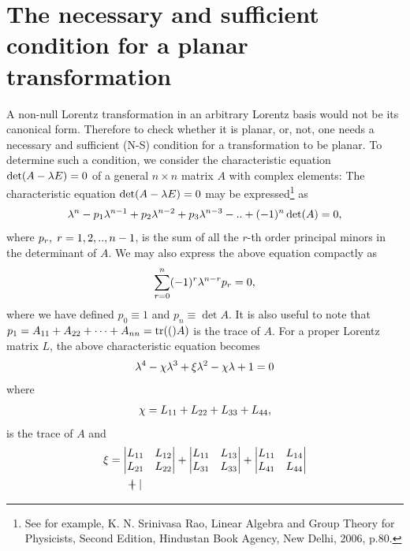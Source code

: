 {\section{The necessary and sufficient condition for a 
planar transformation}
A non-null Lorentz transformation in an arbitrary 
Lorentz basis would not be its canonical form. 
Therefore to check whether it is planar, or, not,  one 
needs a necessary and sufficient (N-S) condition for a 
transformation to be planar. To determine such a 
condition, we consider the characteristic equation 
$\det(A-{\lambda} E)=0 $ of a general $n\times n$ matrix 
$A$ 
with complex elements: The characteristic equation 
$\det(A-{\lambda} E)=0$ may be expressed\footnote{See for 
example, K. N. Srinivasa Rao, {Linear Algebra and 
Group Theory for Physicists}, Second Edition, 
Hindustan 
Book Agency, New Delhi, 2006, p.80.} as 
\begin{align*}
{\lambda}^n-p_1 {\lambda}^{n-1}+p_2 {\lambda}^{n-2}+p_3
{\lambda}^{n-3}-.. +(-1)^{n}\det(A)=0,
\end{align*}
where $p_r,\; r=1,2,.., n-1$, is the {sum of all the 
$r$-th order principal minors} in the determinant of 
$A$. We may also express  the above equation compactly 
as
\begin{align}\label{geom.105}
\sum_{r=0}^n(-1)^r {\lambda}^{n-r}p_r=0,
\end{align}
where we have defined $p_0\equiv 1$ and $p_n\equiv 
\det{A}$. It is also useful to note that 
$p_1=A_{11}+A_{22}+\cdots +A_{nn}=\text{tr}(()A)$ is the trace 
of $A$. For a proper Lorentz matrix $L$, the above 
characteristic equation becomes
\begin{align}\label{geom.106}
 {\lambda}^4-{\chi}{\lambda}^3+ {\xi}{\lambda}^2-{\chi}{\lambda}+1=0
\end{align}
where
\begin{align}\label{geom.107}
 {\chi}=L_{11}+L_{22}+L_{33}+L_{44},
\end{align}
is the trace of $A$ and
\begin{align}\label{geom.108}
&{\xi}=
  \begin{vmatrix} 
L_{11}&L_{12}\\L_{21}&L_{22}\end{vmatrix}
+\begin{vmatrix} 
L_{11}&L_{13}\\L_{31}&L_{33}\end{vmatrix}
+\begin{vmatrix} 
L_{11}&L_{14}\\L_{41}&L_{44}\end{vmatrix}
 \notag \\&\qquad+ \begin{vmatrix}

\end{vmatrix}
\end{align}}
